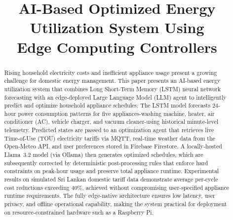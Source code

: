 \documentclass[conference]{IEEEtran}
\begin{document}
\title{AI-Based Optimized Energy Utilization System Using\\Edge Computing Controllers}

\author{%
  \medskip
}

\maketitle

\begin{abstract}
Rising household electricity costs and inefficient appliance usage
present a growing challenge for domestic energy management.
This paper presents an AI-based energy utilization system that
combines Long Short-Term Memory (LSTM) neural network forecasting
with an edge-deployed Large Language Model (LLM) agent to
intelligently predict and optimize household appliance schedules.
The LSTM model forecasts 24-hour power consumption patterns
for five appliances-washing machine, heater, air conditioner
(AC), vehicle charger, and vacuum cleaner-using historical
minute-level telemetry.
Predicted states are passed to an optimization agent that
retrieves live Time-of-Use (TOU) electricity tariffs via MQTT,
real-time weather data from the Open-Meteo API, and user
preferences stored in Firebase Firestore.
A locally-hosted Llama~3.2 model (via Ollama) then generates
optimized schedules, which are subsequently corrected by
deterministic post-processing rules that enforce hard constraints
on peak-hour usage and preserve total appliance runtime.
Experimental results on simulated Sri Lankan domestic tariff data
demonstrate average per-cycle cost reductions exceeding 40\%,
achieved without compromising user-specified appliance runtime
requirements.
The fully edge-native architecture ensures low latency, user
privacy, and offline operational capability, making the system
practical for deployment on resource-constrained hardware such
as a Raspberry Pi.
\end{abstract}
\end{document}
